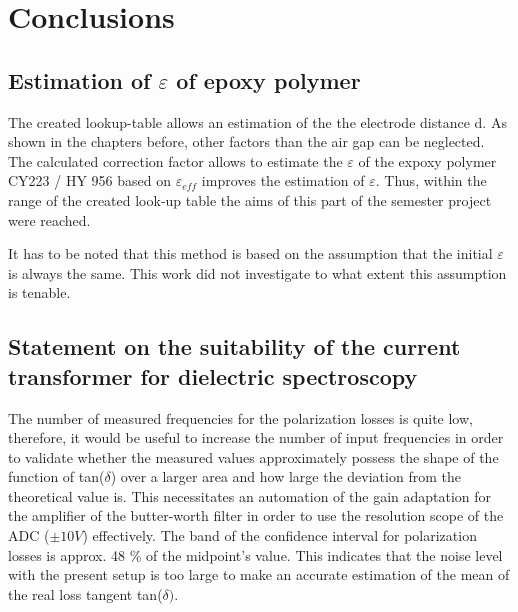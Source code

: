 \chapter{Conclusions}
\section{Estimation of $\varepsilon$ of epoxy polymer}
The created lookup-table allows an estimation of the the electrode distance d.  As shown in the chapters before, other factors than the air gap can be neglected. The calculated correction factor allows to estimate the $\varepsilon$ of the expoxy polymer CY223 / HY 956 based on $\varepsilon_{eff}$ improves the estimation of $\varepsilon$. Thus, within the range of the created look-up table the aims of this part of the semester project were reached. 

It has to be noted that this method is based on the assumption that the initial $\varepsilon$ is always the same. This work did not investigate to what extent this assumption is tenable. 

\section{Statement on the suitability of the current transformer for dielectric spectroscopy}

The number of measured frequencies for the polarization losses is quite low, therefore, it would be useful to increase the number of input frequencies in order to validate whether the measured values approximately possess the shape of the function of tan($\delta$) over a larger area and how large the deviation from the theoretical value is. This necessitates an automation of the gain adaptation for the amplifier of the butter-worth filter in order to use the resolution scope of the ADC ($\pm 10V$)  effectively. 
The band of the confidence interval for polarization losses is approx. 48 \% of the midpoint's value. This indicates that the noise level with the present setup is too large to make an accurate estimation of the mean of the real loss tangent tan($\delta)$.





